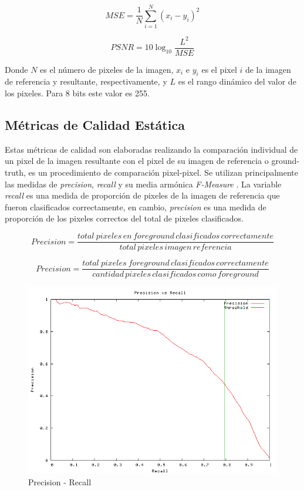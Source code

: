 \begin{equation}
MSE=\frac{1}{N}\sum_{i=1}^N(x_{i}-y_{i})^2
\end{equation}

\begin{equation}
PSNR = 10\log_{10} {\frac{L^2}{MSE}}
\end{equation}

Donde $N$ es el número de pixeles de la imagen, $x_{i}$ e $y_{i}$ es el pixel $i$ de la imagen de referencia y resultante, respectivamente, y $L$ es el rango dinámico del valor de los pixeles. Para 8 bits este valor es 255.
 

\subsection{Métricas de Calidad Estática}
Estas métricas de calidad son elaboradas realizando la comparación individual de un pixel de la imagen resultante con el pixel de su imagen de referencia o ground-truth, es un procedimiento de comparación pixel-pixel. Se utilizan principalmente las medidas de \emph{precision}, \emph{recall} y su media armónica \emph{F-Measure} \cite{brutzer_evaluation_2011} \cite{herrero_background_2009} \cite{park_benchmark_2013}. La variable \emph{recall} es una medida de proporción de pixeles de la imagen de referencia que fueron clasificados correctamente, en cambio, \emph{precision} es una medida de proporción de los pixeles correctos del total de pixeles clasificados.

\begin{equation}
Precision=\frac{total \: pixeles \, en \, foreground \, clasificados \, correctamente}{total \, pixeles \, imagen \, referencia}
\end{equation}

\begin{equation}
Precision=\frac{total \: pixeles \: foreground \, clasificados \, correctamente}{cantidad \, pixeles \, clasificados \, como \, foreground}
\end{equation}



\begin{figure}[!ht]
\centering
\includegraphics[scale=0.4]{img/prcurve}
\caption{Precision - Recall}
\label{fig:precison versus recall}
\end{figure}


